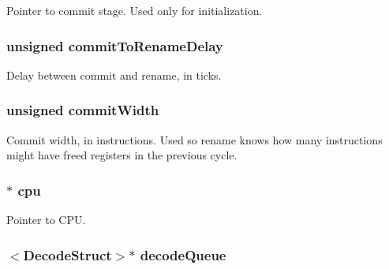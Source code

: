 \label{classDefaultRename_a51b23beeb9e078c0c11831d0f2e56bfd}
Pointer to commit stage. Used only for initialization. \hypertarget{classDefaultRename_a03ebbedbf40ac0005574e50b3577a651}{
\subsubsection[{commitToRenameDelay}]{\setlength{\rightskip}{0pt plus 5cm}unsigned {\bf commitToRenameDelay}}}
\label{classDefaultRename_a03ebbedbf40ac0005574e50b3577a651}
Delay between commit and rename, in ticks. \hypertarget{classDefaultRename_aeab15260a0ccc0ea470bb74344b63d17}{
\subsubsection[{commitWidth}]{\setlength{\rightskip}{0pt plus 5cm}unsigned {\bf commitWidth}}}
\label{classDefaultRename_aeab15260a0ccc0ea470bb74344b63d17}
Commit width, in instructions. Used so rename knows how many instructions might have freed registers in the previous cycle. \hypertarget{classDefaultRename_a1379cf882a12ac6fc9eba5da7c84b18b}{
\subsubsection[{cpu}]{$\ast$ {\bf cpu}}}
\label{classDefaultRename_a1379cf882a12ac6fc9eba5da7c84b18b}
Pointer to CPU. \hypertarget{classDefaultRename_a7860fc5736574343c9e294cb2bef9d93}{
\subsubsection[{decodeQueue}]{$<${\bf DecodeStruct}$>$$\ast$ {\bf decodeQueue}}}
